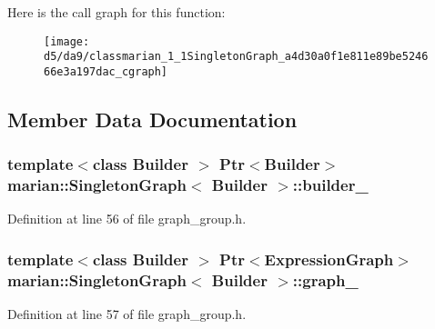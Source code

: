 Here is the call graph for this function\+:
\nopagebreak
\begin{figure}[H]
\begin{center}
\leavevmode
\texttt{[image: d5/da9/classmarian\_1\_1SingletonGraph\_a4d30a0f1e811e89be524666e3a197dac\_cgraph]}
\end{center}
\end{figure}




\subsection{Member Data Documentation}
\subsubsection[{\texorpdfstring{builder\+\_\+}{builder_}}]{\setlength{\rightskip}{0pt plus 5cm}template$<$class Builder $>$ {\bf Ptr}$<$Builder$>$ {\bf marian\+::\+Singleton\+Graph}$<$ Builder $>$\+::builder\+\_\+\hspace{0.3cm}{\ttfamily [private]}}\hypertarget{classmarian_1_1SingletonGraph_ab7a764885f417a8b40b406dde8eddd4f}{}\label{classmarian_1_1SingletonGraph_ab7a764885f417a8b40b406dde8eddd4f}


Definition at line 56 of file graph\+\_\+group.\+h.

\subsubsection[{\texorpdfstring{graph\+\_\+}{graph_}}]{\setlength{\rightskip}{0pt plus 5cm}template$<$class Builder $>$ {\bf Ptr}$<${\bf Expression\+Graph}$>$ {\bf marian\+::\+Singleton\+Graph}$<$ Builder $>$\+::graph\+\_\+\hspace{0.3cm}{\ttfamily [private]}}\hypertarget{classmarian_1_1SingletonGraph_af928149755ed8695c3628e3f9299da59}{}\label{classmarian_1_1SingletonGraph_af928149755ed8695c3628e3f9299da59}


Definition at line 57 of file graph\+\_\+group.\+h.

